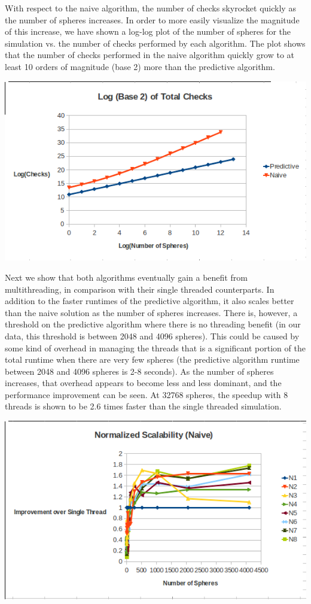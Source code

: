 \documentclass[conference]{IEEEtran}
\begin{document}
With respect to the naive algorithm, the number of checks skyrocket quickly as the number of spheres increases.  In order to more easily visualize the magnitude of this increase, we have shown a log-log plot of the number of spheres for the simulation vs. the number of checks performed by each algorithm.  The plot shows that the number of checks performed in the naive algorithm quickly grow to at least 10 orders of magnitude (base 2) more than the predictive algorithm.

\begin{center}
	\includegraphics[width=.45\textwidth]{log_total_checks_comparison.png}
\end{center}

Next we show that both algorithms eventually gain a benefit from multithreading, in comparison with their single threaded counterparts.  In addition to the faster runtimes of the predictive algorithm, it also scales better than the naive solution as the number of spheres increases.  There is, however, a threshold on the predictive algorithm where there is no threading benefit (in our data, this threshold is between 2048 and 4096 spheres).  This could be caused by some kind of overhead in managing the threads that is a significant portion of the total runtime when there are very few spheres (the predictive algorithm runtime between 2048 and 4096 spheres is 2-8 seconds).  As the number of spheres increases, that overhead appears to become less and less dominant, and the performance improvement can be seen.  At 32768 spheres, the speedup with 8 threads is shown to be 2.6 times faster than the single threaded simulation.

\begin{center}
	\includegraphics[width=.45\textwidth]{normalized_scalability_naive.png}
\end{center}
\end{document}
